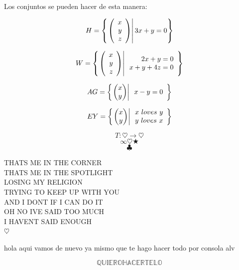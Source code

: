 \documentclass[10pt]{article}
\begin{document}
\problem{}

Los conjuntos se pueden hacer de esta manera:

$$H=\left\{ \left. \left( \begin{array}{r} x\\ y\\ z \end{array} \right) \right| 3x+y=0 \right\} $$

$$W=\left\{ \left. \left( \begin{array}{r} x\\ y\\ z \end{array} \right) \right| \begin{array}{r}
2x+y=0\\
x+y+4z=0\\
\end{array} \right\} $$

$$AG=\llaves{\vectrdos{x}{y}}{\begin{array}{r}
x-y=0\\


\end{array}}$$

$$EY=\left\{ \left. \begin{pmatrix} x\\ y\\ \end{pmatrix} \right| \begin{array}{r}
x\ loves\ y\\
y\ loves\ x\\
\end{array} \right\}$$

$$T : \heartsuit \rightarrow \heartsuit$$
$$\infty \heartsuit \bigstar $$
$$\clubsuit$$

THATS ME IN THE CORNER~\\
THATS ME IN THE SPOTLIGHT\\
LOSING MY RELIGION~\\
TRYING TO KEEP UP WITH YOU~\\
AND I DONT IF I CAN DO IT~\\
OH NO IVE SAID TOO MUCH~\\
I HAVENT SAID ENOUGH\\

$\heartsuit$

hola
aqui vamos de nuevo
ya mismo que te hago hacer todo por consola alv


$$\mathbb{QUIERO HACERTELO}$$
\end{document}
